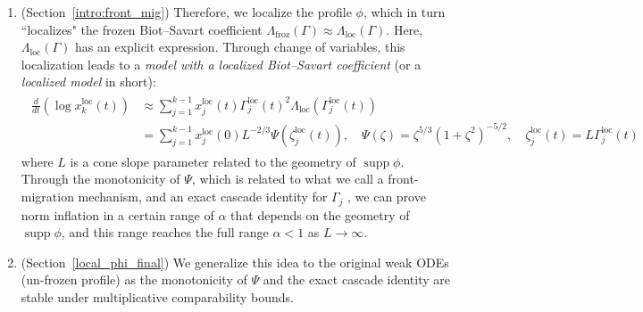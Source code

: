 \documentclass[reqno,11pt]{amsart}
\newcommand{\supp}{\operatorname{supp}}
\begin{document}
\begin{enumerate}
    \item (Section~\ref{intro:front_mig})
        Therefore, we localize the profile $\phi$, which in turn ``localizes" the frozen Biot--Savart coefficient $\Lambda _{\mathrm{froz}}(\Gamma)\approx \Lambda_{\mathrm{loc}} (\Gamma)$. Here, $\Lambda_{\mathrm{loc}} (\Gamma)$ has an explicit expression. Through change of variables, this localization leads to a \emph{model with a localized Biot--Savart coefficient} (or a \emph{localized model} in short):
        \begin{align}
        \label{eq:loc_coe_model}
        \begin{aligned}
            \frac{d}{dt} (\log x_k^{\mathrm{loc}}(t))
            &\approx 
            \sum_{j=1}^{k-1}
             x_j^{\mathrm{loc}}(t) \Gamma_j^{\mathrm{loc}}(t)^2 \Lambda_{\mathrm{loc}}(\Gamma_j^{\mathrm{loc}}(t))
            \\
            &=
            \sum_{j=1}^{k-1}
            x_j^{\mathrm{loc}}(0) L^{-2/3} \Psi (\zeta_j^{\mathrm{loc}}(t)),
            \quad \Psi(\zeta)=\zeta^{5/3}(1+\zeta^2)^{-5/2}, 
            \quad \zeta_j^{\mathrm{loc}}(t) =L  \Gamma_j^{\mathrm{loc}}(t)
        \end{aligned}
        \end{align}
        where $L$ is a cone slope parameter related to the geometry of $\supp \phi$. 
        Through the monotonicity of $\Psi$, which is related to what we call a front-migration mechanism, and an exact cascade identity for $\Gamma_j$ , we can prove norm inflation in a certain range of $\alpha$ that depends on the geometry of $\supp \phi$, and this range reaches the full range $\alpha<1$ as $L\to\infty$.
    \item (Section~\ref{local_phi_final}) We generalize this idea to the original weak ODEs (un-frozen profile) as the monotonicity of $\Psi$ and the exact cascade identity are stable under multiplicative comparability bounds.
    \end{enumerate}
\end{document}
